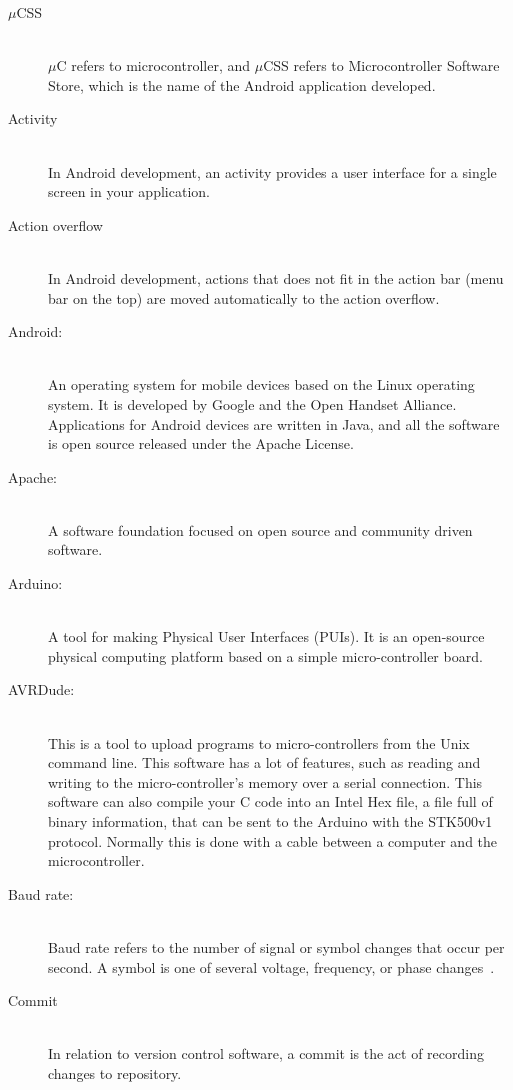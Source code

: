 \begin{description}
	\item[$\mu$CSS] \hfill \\
		$\mu$C refers to microcontroller, and $\mu$CSS refers to Microcontroller Software Store, which is the name of the Android application developed.
	\item[Activity] \hfill \\
		In Android development, an activity provides a user interface for a single screen in your application.
	\item[Action overflow] \hfill \\
		In Android development, actions that does not fit in the action bar (menu bar on the top) are moved automatically to the action overflow.
	\item[Android:]\hfill \\
		An operating system for mobile devices based on the Linux operating system. It is developed by Google and the Open Handset Alliance. Applications for Android devices are written in Java, and all the software is open source released under the Apache License.
	\item[Apache:] \hfill \\
		A software foundation focused on open source and community driven software.
	\item[Arduino:]\hfill \\
		A tool for making Physical User Interfaces (PUIs). It is an open-source physical computing platform based on a simple micro-controller board.
	\item[AVRDude:]\hfill \\
		This is a tool to upload programs to micro-controllers from the Unix command line. This software has a lot of features, such as reading and writing to the micro-controller's memory over a serial connection. This software can also compile your C code into an Intel Hex file, a file full of binary information, that can be sent to the Arduino with the STK500v1 protocol. Normally this is done with a cable between a computer and the microcontroller.
	\item[Baud rate:]\hfill \\
		Baud rate refers to the number of signal or symbol changes that occur per second. A symbol is one of several voltage, frequency, or phase changes~\cite{baudrate}.
	\item[Commit]\hfill \\
		In relation to version control software, a commit is the act of recording changes to repository.

\end{description}
